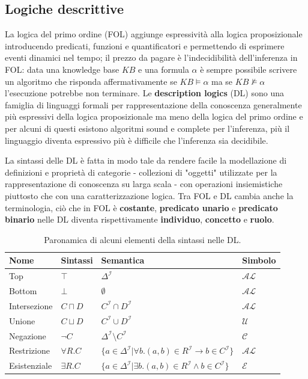 \documentclass{article}
\begin{document}
\subsection{Logiche descrittive}
La logica del primo ordine (FOL) aggiunge espressività alla logica proposizionale introducendo predicati, funzioni e quantificatori e permettendo di esprimere eventi dinamici nel tempo; il prezzo da pagare è l'indecidibilità dell'inferenza in FOL: data una knowledge base $KB$ e una formula $\alpha$ è sempre possibile scrivere un algoritmo che risponda affermativamente se $KB \models \alpha$ ma se $KB \nvDash \alpha$ l'esecuzione potrebbe non terminare. Le \textbf{description logics} (DL) sono una famiglia di linguaggi formali per rappresentazione della conoscenza generalmente più espressivi della logica proposizionale ma meno della logica del primo ordine e per alcuni di questi esistono algoritmi sound e complete per l'inferenza, più il linguaggio diventa espressivo più è difficile che l'inferenza sia decidibile. 

La sintassi delle DL è fatta in modo tale da rendere facile la modellazione di definizioni e proprietà di categorie - collezioni di "oggetti" utilizzate per la rappresentazione di conoscenza su larga scala - con operazioni insiemistiche piuttosto che con una caratterizzazione logica. Tra FOL e DL cambia anche la terminologia, ciò che in FOL è \textbf{costante}, \textbf{predicato unario} e \textbf{predicato binario} nelle DL diventa rispettivamente \textbf{individuo}, \textbf{concetto} e \textbf{ruolo}.

\begin{table}[h!t] 
    \centering
    \begin{longtable}{p{}p{}p{}p{}}
        \textbf{Nome} & \textbf{Sintassi} & \textbf{Semantica} & \textbf{Simbolo} \\
        \hline
        Top & $\top$ & $\Delta^{\mathcal{I}}$ & $\mathcal{AL}$ \\
        Bottom & $\bot$ & $\emptyset$ & $\mathcal{AL}$\\
        Intersezione & $C \sqcap D$ & $C^{\mathcal{I}} \cap D^{\mathcal{I}}$ & $\mathcal{AL}$ \\
        Unione & $C \sqcup D$ & $C^{\mathcal{I}} \cup D^{\mathcal{I}}$ & $\mathcal{U}$ \\ 
        Negazione & $\neg C$ & $\Delta^{\mathcal{I}} \setminus C^{\mathcal{I}}$ & $\mathcal{C}$ \\
        Restrizione & $\forall R.C$ & 
        $\{ a \in \Delta^{\mathcal{I}} | \forall b.(a,b) \in R^{\mathcal{I}} \rightarrow b \in C^{\mathcal{I}} \}$ & $\mathcal{AL}$ \\
        Esistenziale & $\exists R.C$ & 
        $\{ a \in \Delta^{\mathcal{I}} | \exists b.(a,b) \in R^{\mathcal{I}} \land b \in C^{\mathcal{I}} \}$ & $\mathcal{E}$ \\
        \hline
    \end{longtable}
    \caption{Paronamica di alcuni elementi della sintassi nelle DL.}
    \label{tab:syntax_DL}
\end{table}
\end{document}

